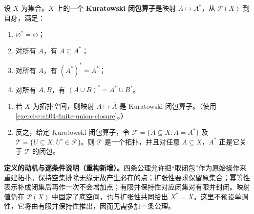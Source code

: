 \documentclass[../../main.tex]{subfiles}%
\begin{document}
\begin{exercise}\label{exercise:ch04-kuratowski-closure}
\begin{definition*}\label{definition:ch04-kuratowski-closure}
设 $X$ 为集合。$X$ 上的一个 \textbf{Kuratowski 闭包算子}是映射 $A\mapsto A^*$，从 $\mathscr P(X)$ 到自身，满足：
\begin{enumerate}[label=(\roman*)]
\item $\varnothing^*=\varnothing$；
\item 对所有 $A$，有 $A\subseteq A^*$；
\item 对所有 $A$，有 $(A^*)^*=A^*$；
\item 对所有 $A,B$，有 $(A\cup B)^*=A^*\cup B^*$。
\end{enumerate}
\end{definition*}
\begin{enumerate}
\item\label{item:ch04-kuratowski-from-topology} 若 $X$ 为拓扑空间，则映射 $A\mapsto\overline A$ 是 Kuratowski 闭包算子。（使用\cref{exercise:ch04-finite-union-closure}。）
\item\label{item:ch04-kuratowski-to-topology} 反之，给定 Kuratowski 闭包算子，令 $\mathcal F=\{A\subseteq X:A=A^*\}$ 及 $\mathcal T=\{U\subseteq X:U^c\in\mathcal F\}$。则 $\mathcal T$ 是一个拓扑，并且对任意 $A\subseteq X$，$A^*$ 正是它关于 $\mathcal T$ 的闭包。
\end{enumerate}
\end{exercise}
\begin{remark}
\textbf{定义的动机与逐条件说明（重构新增）。}四条公理允许把“取闭包”作为原始操作来重建拓扑。保持空集排除无缘无故产生必在的点；扩张性要求保留原集合；幂等性表示补成闭集后再作一次不会增加点；有限并保持性对应闭集对有限并封闭。映射值仍在 $\mathscr P(X)$ 中固定了底空间，也与扩张性共同给出 $X^*=X$。这里不预设单调性，它将由有限并保持性推出，因而无需多加一条公理。
\end{remark}
\end{document}
